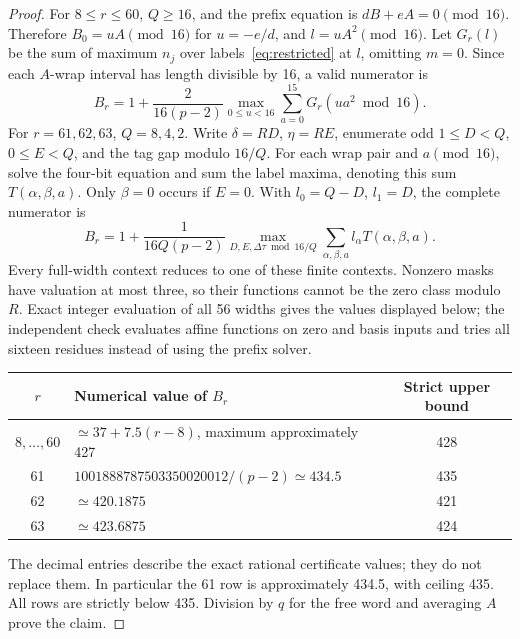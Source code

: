\begin{proof}
For $8\le r\le60$, $Q\ge16$, and the prefix equation is $dB+eA=0\pmod{16}$. Therefore $B_0=uA\pmod{16}$ for $u=-e/d$, and $l=uA^2\pmod{16}$. Let $G_r(l)$ be the sum of maximum $n_j$ over labels~\eqref{eq:restricted} at $l$, omitting $m=0$. Since each $A$-wrap interval has length divisible by 16, a valid numerator is
\begin{equation}\label{eq:tailfirst}
 B_r=1+\frac{2}{16(p-2)}\max_{0\le u<16}\sum_{a=0}^{15}G_r(ua^2\bmod16).
\end{equation}
For $r=61,62,63$, $Q=8,4,2$. Write $\delta=RD$, $\eta=RE$, enumerate odd $1\le D<Q$, $0\le E<Q$, and the tag gap modulo $16/Q$. For each wrap pair and $a\pmod{16}$, solve the four-bit equation and sum the label maxima, denoting this sum $T(\alpha,\beta,a)$. Only $\beta=0$ occurs if $E=0$. With $l_0=Q-D$, $l_1=D$, the complete numerator is
\begin{equation}\label{eq:taillast}
 B_r=1+\frac{1}{16Q(p-2)}\max_{D,E,\Delta\tau\bmod16/Q}
 \sum_{\alpha,\beta,a}l_\alpha T(\alpha,\beta,a).
\end{equation}
Every full-width context reduces to one of these finite contexts. Nonzero masks have valuation at most three, so their functions cannot be the zero class modulo $R$. Exact integer evaluation of all 56 widths gives the values displayed below; the independent check evaluates affine functions on zero and basis inputs and tries all sixteen residues instead of using the prefix solver.
\begin{center}
\begin{tabular}{@{}clc@{}}\toprule
$r$&Numerical value of $B_r$&Strict upper bound\\\midrule
$8,\ldots,60$&$\simeq37+7.5(r-8)$, maximum approximately 427&428\\
61&$1001888787503350020012/(p-2)\simeq434.5$&435\\
62&$\simeq420.1875$&421\\
63&$\simeq423.6875$&424\\\bottomrule
\end{tabular}
\end{center}
The decimal entries describe the exact rational certificate values; they do not replace them. In particular the 61 row is approximately 434.5, with ceiling 435. All rows are strictly below 435. Division by $q$ for the free word and averaging $A$ prove the claim.
\end{proof}

